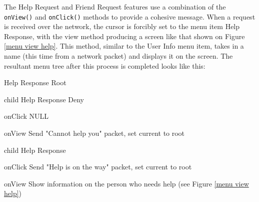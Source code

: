 \documentclass[journal,compsoc]{IEEEtran}
\begin{document}
The Help Request and Friend Request features use a combination of the \lstinline[columns=fixed]{onView()} and \lstinline[columns=fixed]{onClick()} methods to provide a cohesive message. When a request is received over the network, the cursor is forcibly set to the menu item Help Response, with the view method producing a screen like that shown on Figure \ref{menu view help}. This method, similar to the User Info menu item, takes in a name (this time from a network packet) and displays it on the screen. The resultant menu tree after this process is completed looks like this:

\begin{itemize}
	\item Help Response Root
    \begin{LaTeXdescription}
        \item[child] Help Response Deny
        	\begin{LaTeXdescription}
                \item[onClick] NULL
                \item[onView] Send "Cannot help you" packet, set current to root
                \item[child] Help Response
                    \begin{LaTeXdescription}
                        \item[onClick] Send "Help is on the way" packet, set current to root
                        \item[onView] Show information on the person who needs help (see Figure \ref{menu view help})
    				\end{LaTeXdescription}
            \end{LaTeXdescription}
    \end{LaTeXdescription}
\end{itemize}
\end{document}
